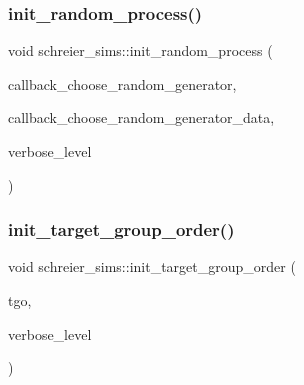 \subsubsection{\texorpdfstring{init\+\_\+random\+\_\+process()}{init\_random\_process()}}
{\footnotesize\ttfamily void schreier\+\_\+sims\+::init\+\_\+random\+\_\+process (\begin{DoxyParamCaption}\item[{void($\ast$)(\mbox{\hyperlink{galois_8h_a09fddde158a3a20bd2dcadb609de11dc}{I\+NT}} \mbox{\hyperlink{classschreier__sims_a11b719a35db207e78f21da7c98d67d18}{iteration}}, \mbox{\hyperlink{galois_8h_a09fddde158a3a20bd2dcadb609de11dc}{I\+NT}} $\ast$\mbox{\hyperlink{simeon_8_c_aec1406935bdb1fee3561fcb840964100}{Elt}}, void $\ast$data, \mbox{\hyperlink{galois_8h_a09fddde158a3a20bd2dcadb609de11dc}{I\+NT}} \mbox{\hyperlink{simeon_8_c_a818073fbcc2f439e7c56952f67386122}{verbose\+\_\+level}})}]{callback\+\_\+choose\+\_\+random\+\_\+generator,  }\item[{void $\ast$}]{callback\+\_\+choose\+\_\+random\+\_\+generator\+\_\+data,  }\item[{\mbox{\hyperlink{galois_8h_a09fddde158a3a20bd2dcadb609de11dc}{I\+NT}}}]{verbose\+\_\+level }\end{DoxyParamCaption})}

\mbox{\label{classschreier__sims_af495ce69982ff0d5ceb09b40db328f60}} 
\subsubsection{\texorpdfstring{init\+\_\+target\+\_\+group\+\_\+order()}{init\_target\_group\_order()}}
{\footnotesize\ttfamily void schreier\+\_\+sims\+::init\+\_\+target\+\_\+group\+\_\+order (\begin{DoxyParamCaption}\item[{\mbox{\hyperlink{classlonginteger__object}{longinteger\+\_\+object}} \&}]{tgo,  }\item[{\mbox{\hyperlink{galois_8h_a09fddde158a3a20bd2dcadb609de11dc}{I\+NT}}}]{verbose\+\_\+level }\end{DoxyParamCaption})}

\mbox{\label{classschreier__sims_ae16c57c3e24bb0c2d2d5c8d8e73e4b95}} 
